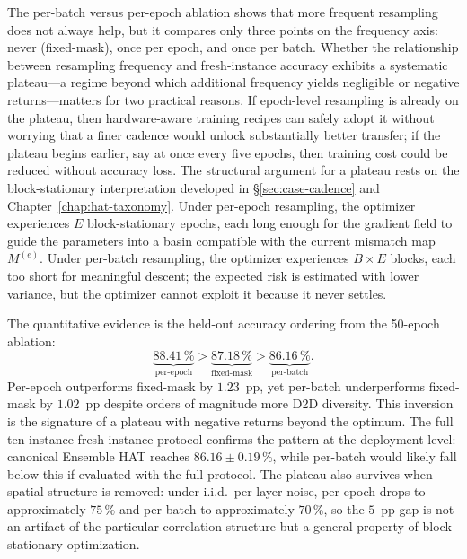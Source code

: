 The per-batch versus per-epoch ablation shows that more frequent resampling does not always help, but it compares only three points on the frequency axis: never (fixed-mask), once per epoch, and once per batch. Whether the relationship between resampling frequency and fresh-instance accuracy exhibits a systematic plateau---a regime beyond which additional frequency yields negligible or negative returns---matters for two practical reasons. If epoch-level resampling is already on the plateau, then hardware-aware training recipes can safely adopt it without worrying that a finer cadence would unlock substantially better transfer; if the plateau begins earlier, say at once every five epochs, then training cost could be reduced without accuracy loss. The structural argument for a plateau rests on the block-stationary interpretation developed in \S\ref{sec:case-cadence} and Chapter~\ref{chap:hat-taxonomy}. Under per-epoch resampling, the optimizer experiences $E$ block-stationary epochs, each long enough for the gradient field to guide the parameters into a basin compatible with the current mismatch map $M^{(e)}$. Under per-batch resampling, the optimizer experiences $B\times E$ blocks, each too short for meaningful descent; the expected risk is estimated with lower variance, but the optimizer cannot exploit it because it never settles.

The quantitative evidence is the held-out accuracy ordering from the 50-epoch ablation:
\begin{equation}
    \underbrace{88.41\,\%}_{\text{per-epoch}} > \underbrace{87.18\,\%}_{\text{fixed-mask}} > \underbrace{86.16\,\%}_{\text{per-batch}}.
    \label{eq:plateau-ordering}
\end{equation}
Per-epoch outperforms fixed-mask by $1.23$~pp, yet per-batch underperforms fixed-mask by $1.02$~pp despite orders of magnitude more D2D diversity. This inversion is the signature of a plateau with negative returns beyond the optimum. The full ten-instance fresh-instance protocol confirms the pattern at the deployment level: canonical Ensemble HAT reaches $86.16\pm0.19\,\%$, while per-batch would likely fall below this if evaluated with the full protocol. The plateau also survives when spatial structure is removed: under i.i.d.~per-layer noise, per-epoch drops to approximately $75\,\%$ and per-batch to approximately $70\,\%$, so the $5$~pp gap is not an artifact of the particular correlation structure but a general property of block-stationary optimization.

